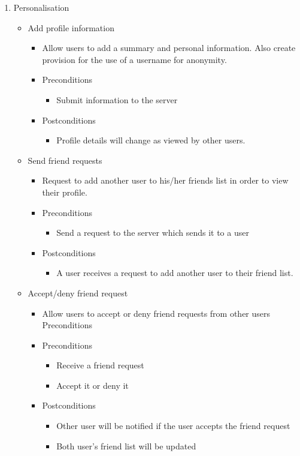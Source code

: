 \documentclass[12pt]{article}
\begin{document}
\begin{enumerate}
			\item Personalisation
			\begin{itemize}
				\item Add profile information
				\begin{itemize}
					\item Allow users to add a summary and personal information. Also create provision for the use of a username for anonymity.
					\item Preconditions
					\begin{itemize}
						\item Submit information to the server
					\end{itemize}
					\item Postconditions
					\begin{itemize}
						\item Profile details will change as viewed by other users.
					\end{itemize}
				\end{itemize}
				
				\item Send friend requests
				\begin{itemize}
					\item Request to add another user to his/her friends list in order to view their profile.
					\item Preconditions
					\begin{itemize}
						\item Send a request to the server which sends it to a user
					\end{itemize}
					\item Postconditions
					\begin{itemize}
						\item A user receives a request to add another user to their friend list.
					\end{itemize}
				\end{itemize}
				
				\item Accept/deny friend request
				\begin{itemize}
					\item Allow users to accept or deny friend requests from other users
Preconditions

					\item Preconditions
					\begin{itemize}
						\item Receive a friend request
						\item Accept it or deny it
					\end{itemize}
					\item Postconditions
					\begin{itemize}
						\item Other user will be notified if the user accepts the friend request
						\item Both user’s friend list will be updated
					\end{itemize}
				\end{itemize}
				

\end{itemize}
\end{enumerate}
\end{document}

